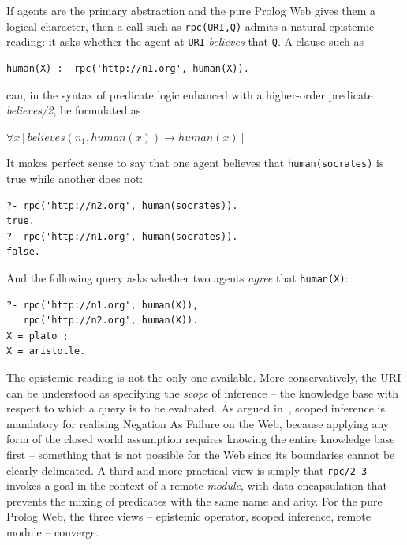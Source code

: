 If agents are the primary abstraction and the pure Prolog Web gives them
a logical character, then a call such as \texttt{rpc(URI,Q)} admits a
natural epistemic reading: it asks whether the agent at \texttt{URI}
\emph{believes} that \texttt{Q}. A clause such as

\begin{verbatim}
human(X) :- rpc('http://n1.org', human(X)).
\end{verbatim}

\noindent can, in the syntax of predicate logic enhanced with a
higher-order predicate \emph{believes/2}, be formulated as

\begin{center}
$\forall x [\mathit{believes}(n_1, \mathit{human}(x)) \rightarrow
\mathit{human}(x)]$
\end{center}

\noindent It makes perfect sense to say that one agent believes that
\texttt{human(socrates)} is true while another does not:

\begin{verbatim}
?- rpc('http://n2.org', human(socrates)).
true.
?- rpc('http://n1.org', human(socrates)).
false.
\end{verbatim}

\noindent And the following query asks whether two agents \emph{agree}
that \texttt{human(X)}:

\begin{verbatim}
?- rpc('http://n1.org', human(X)),
   rpc('http://n2.org', human(X)).
X = plato ;
X = aristotle.
\end{verbatim}

\noindent The epistemic reading is not the only one available. More
conservatively, the URI can be understood as specifying the \emph{scope}
of inference -- the knowledge base with respect to which a query is to
be evaluated. As argued in~\cite{Kifer2005}, scoped inference is
mandatory for realising Negation As Failure on the Web, because applying
any form of the closed world assumption requires knowing the entire
knowledge base first -- something that is not possible for the Web since
its boundaries cannot be clearly delineated. A third and more practical
view is simply that \texttt{rpc/2-3} invokes a goal in the context of a
remote \emph{module}, with data encapsulation that prevents the mixing
of predicates with the same name and arity. For the pure Prolog Web,
the three views -- epistemic operator, scoped inference, remote module
-- converge.

